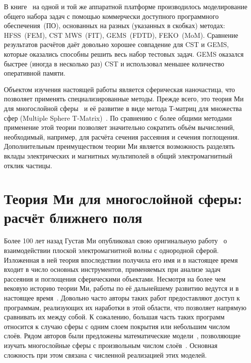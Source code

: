В книге~\cite{Yu-Advanced-FDTD-2011} на одной и той же аппаратной
платформе производилось моделирование общего набора задач с помощью
коммерчески доступного программного обеспечения~(ПО), основанных на разных
(указанных в скобках) методах: HFSS~(FEM), CST MWS~(FIT), GEMS~(FDTD),
FEKO~(MoM). Сравнение результатов расчётов даёт довольно хорошее
совпадение для CST и GEMS, которые оказались способны решить весь
набор тестовых задач. GEMS оказался быстрее (иногда в несколько раз)
CST и использовал меньшее количество оперативной памяти.

Объектом изучения настоящей работы является сферическая наночастица,
что позволяет применять специализированные методы. Прежде
всего, это теория Ми для многослойной сферы~\cite{Yang-2003} и её
развитие в виде метода Т-матриц для множества сфер (Multiple Sphere
T-Matrix)~\cite{MacKowski-2012}.  По сравнению с более общими методами
применение этой теории позволяет значительно сократить объём
вычислений, необходимый, например, для расчёта сечения рассеяния и
сечения поглощения.  Дополнительным преимуществом теории Ми является
возможность разделять вклады электрических и магнитных мультиполей в
общий электромагнитный отклик частицы.


\section{Теория Ми для многослойной сферы: расчёт ближнего поля}
\label{sec:Mie}

Более 100 лет назад Густав Ми опубликовал свою оригинальную
работу~\cite{Mie-1908} о взаимодействии плоской электромагнитной волны
с однородной сферой.  Изложенная в ней теория впоследствии получила
его имя и в настоящее время входит в число основных инструментов,
применяемых при анализе задач рассеяния и поглощения сферическими
объектами.  Несмотря на более чем вековую историю теории Ми, работы по
её дальнейшему развитию ведутся и в настоящее время~\cite{Suzuki-2008,
  MacKowski-2012, Lerme-2000, Xu-2005, Li-2006, Gogoi-2010,
  Santiago-2011}.  Довольно часто авторы таких работ предоставляют
доступ к программам, реализующих их наработки в этой области, что
позволяет напрямую сравнивать их между собой.  К сожалению, большая
часть таких программ относится к случаю сферы с одним слоем покрытия
или небольшим числом слоёв. Рядом авторов были
предложены математические модели~\cite{Yang-2003,
  Pena-scattnlay-2009}, позволяющие изучать многослойные сферы с
произвольным числом слоёв~\cite{Sheehan-2013,Selmke-2012}.  Основная
сложность при этом связана с численной реализацией этих моделей.

